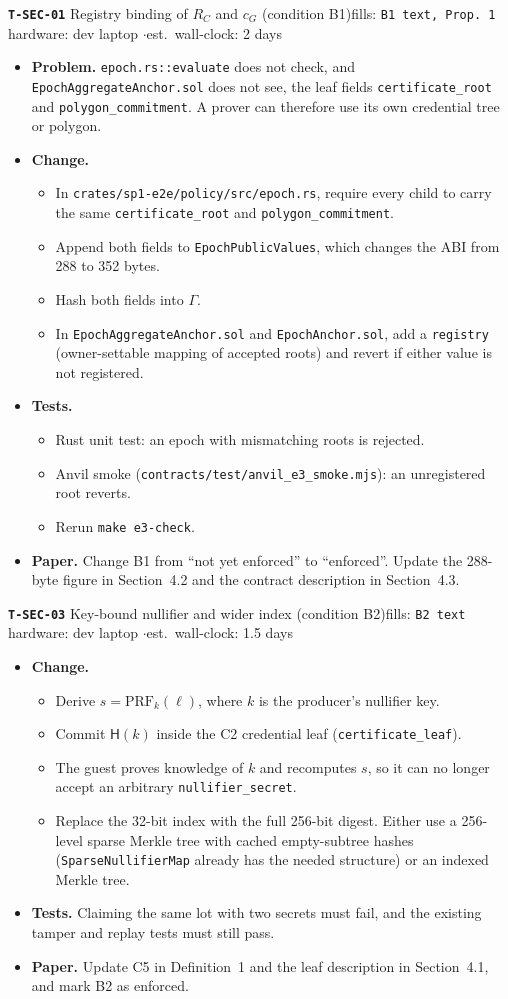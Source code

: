 \documentclass[10pt,a4paper]{article}
\newcommand{\task}[6]{%
\par\medskip\noindent\colorbox{blue!8}{\parbox{\dimexpr\linewidth-2\fboxsep}{%
\textbf{\texttt{#1}} \enspace #2\hfill{\small fills: \texttt{#3}}\\
{\small hardware: #4 \quad$\cdot$\quad est.\ wall-clock: #5}}}\par
\begin{itemize}#6\end{itemize}}
\begin{document}
\task{T-SEC-01}{Registry binding of $R_C$ and $c_G$ (condition B1)}{B1 text, Prop.~1}{dev laptop}{2 days}{
\item \textbf{Problem.} \texttt{epoch.rs::evaluate} does not check, and \texttt{EpochAggregateAnchor.sol} does not see, the leaf fields \texttt{certificate\_root} and \texttt{polygon\_commitment}. A prover can therefore use its own credential tree or polygon.
\item \textbf{Change.}
  \begin{itemize}
  \item In \texttt{crates/sp1-e2e/policy/src/epoch.rs}, require every child to carry the same \texttt{certificate\_root} and \texttt{polygon\_commitment}.
  \item Append both fields to \texttt{EpochPublicValues}, which changes the ABI from 288 to 352 bytes.
  \item Hash both fields into $\Gamma$.
  \item In \texttt{EpochAggregateAnchor.sol} and \texttt{EpochAnchor.sol}, add a \texttt{registry} (owner-settable mapping of accepted roots) and revert if either value is not registered.
  \end{itemize}
\item \textbf{Tests.}
  \begin{itemize}
  \item Rust unit test: an epoch with mismatching roots is rejected.
  \item Anvil smoke (\texttt{contracts/test/anvil\_e3\_smoke.mjs}): an unregistered root reverts.
  \item Rerun \texttt{make e3-check}.
  \end{itemize}
\item \textbf{Paper.} Change B1 from ``not yet enforced'' to ``enforced''. Update the 288-byte figure in Section~4.2 and the contract description in Section~4.3.
}

\task{T-SEC-03}{Key-bound nullifier and wider index (condition B2)}{B2 text}{dev laptop}{1.5 days}{
\item \textbf{Change.}
  \begin{itemize}
  \item Derive $s=\mathrm{PRF}_{k}(\ell)$, where $k$ is the producer's nullifier key.
  \item Commit $\mathsf{H}(k)$ inside the C2 credential leaf (\texttt{certificate\_leaf}).
  \item The guest proves knowledge of $k$ and recomputes $s$, so it can no longer accept an arbitrary \texttt{nullifier\_secret}.
  \item Replace the 32-bit index with the full 256-bit digest. Either use a 256-level sparse Merkle tree with cached empty-subtree hashes (\texttt{SparseNullifierMap} already has the needed structure) or an indexed Merkle tree.
  \end{itemize}
\item \textbf{Tests.} Claiming the same lot with two secrets must fail, and the existing tamper and replay tests must still pass.
\item \textbf{Paper.} Update C5 in Definition~1 and the leaf description in Section~4.1, and mark B2 as enforced.
}
\end{document}
